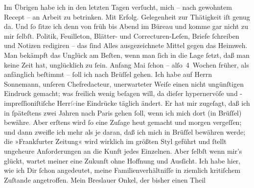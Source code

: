\pstart
           Im Übrigen habe ich in den letzten Tagen verſucht, mich – nach gewohntem Recept – an
               Arbeit zu betrinken. Mit Erfolg. Gelegenheit zur Thätigkeit iſt genug da. Und ſo
               ſitze ich denn von früh bis Abend im Büreau und komme  gar nicht zu mir ſelbſt. Politik, Feuilleton, Blätter- und
               Correcturen-Leſen, Briefe ſchreiben und Notizen redigiren – {\pb}das ſind Alles ausgezeichnete Mittel gegen das
               Heimweh. Man bekämpft das Unglück am Beſten, wenn man ſich in die Lage ſetzt, daß man
               keine Zeit hat, unglücklich zu ſein. Anfang Mai ſchon –
               alſo 4 Wochen früher, als anfänglich beſtimmt – ſoll ich nach Brüſſel gehen. Ich habe auf Herrn Sonnemann, unſeren Chefredacteur, unerwarteter Weiſe einen nicht ungünſtigen
               Eindruck gemacht; was freilich wenig beſagen will, da dieſer hypernervöſe und
               -impreſſioniſtiſche Herr\textcolor{gray}{ſe}ine Eindrücke täglich ändert. Er hat mir zugeſagt, daß ich in
               ſpäteſtens zwei Jahren nach Paris gehen ſoll,
               wenn ich mich dort (in Brüſſel)
                  bewähre\textcolor{gray}{.} Aber erſtens wird ſo eine Zuſage heut gemacht und
               morgen vergeſſen; und dann zweifle ich mehr als je daran, daß ich mich in Brüſſel bewähren {\pb}werde; die »Frankfurter Zeitung« wird wirklich
               im größten Styl geführt und ſtellt ungeheure Anforderungen an die Kunft jedes
               Einzelnen. Aber ſelbſt wenn mir’s glückt, wartet meiner eine Zukunft ohne Hoffnung
               und Ausſicht. Ich habe hier,
               wie ich Dir ſchon angedeutet, meine Familienverhältniſſe in ziemlich kritiſchem
               Zuſtande angetroffen. Mein Breslauer Onkel, der bisher einen Theil
